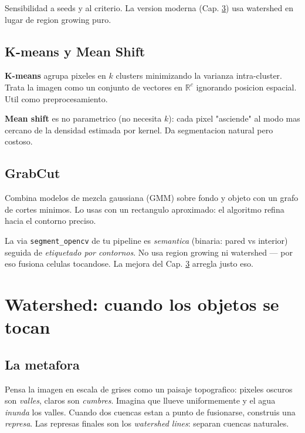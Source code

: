 \documentclass[11pt,a4paper,twoside,openright]{book}
\begin{document}
Sensibilidad a seeds y al criterio. La version moderna (Cap. \ref{ch:watershed}) usa watershed en lugar de region growing puro.

\section{K-means y Mean Shift}

\textbf{K-means} agrupa pixeles en $k$ clusters minimizando la varianza intra-cluster. Trata la imagen como un conjunto de vectores en $\mathbb{R}^c$ ignorando posicion espacial. Util como preprocesamiento.

\textbf{Mean shift} es no parametrico (no necesita $k$): cada pixel "asciende" al modo mas cercano de la densidad estimada por kernel. Da segmentacion natural pero costoso.

\section{GrabCut}

Combina modelos de mezcla gaussiana (GMM) sobre fondo y objeto con un grafo de cortes minimos. Lo usas con un rectangulo aproximado: el algoritmo refina hacia el contorno preciso.

\begin{pipeline}
La via \texttt{segment\_opencv} de tu pipeline es \emph{semantica} (binaria: pared vs interior) seguida de \emph{etiquetado por contornos}. No usa region growing ni watershed --- por eso fusiona celulas tocandose. La mejora del Cap. \ref{ch:watershed} arregla justo eso.
\end{pipeline}

\chapter{Watershed: cuando los objetos se tocan}
\label{ch:watershed}

\section{La metafora}

Pensa la imagen en escala de grises como un paisaje topografico: pixeles oscuros son \emph{valles}, claros son \emph{cumbres}. Imagina que llueve uniformemente y el agua \emph{inunda} los valles. Cuando dos cuencas estan a punto de fusionarse, construis una \emph{represa}. Las represas finales son los \emph{watershed lines}: separan cuencas naturales.
\end{document}
